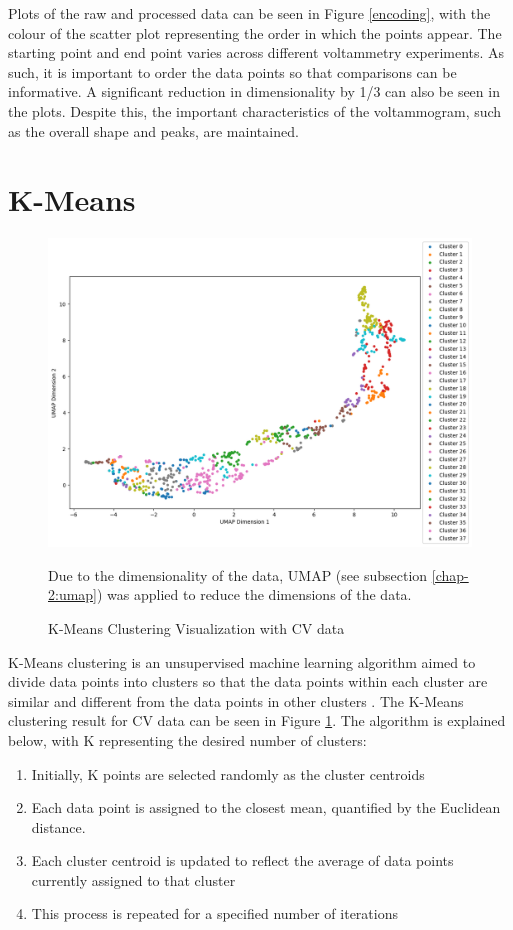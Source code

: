 Plots of the raw and processed data can be seen in Figure \ref{encoding}, with the colour of the scatter plot representing the order in which the points appear. The starting point and end point varies across different voltammetry experiments. As such, it is important to order the data points so that comparisons can be informative. A significant reduction in dimensionality by 1/3 can also be seen in the plots. Despite this, the important characteristics of the voltammogram, such as the overall shape and peaks, are maintained.
\section{K-Means}
\begin{figure}[h!]
  \centering
    \includegraphics[width=1.0\textwidth]{figures/k-means.png}
    \caption{K-Means Clustering Visualization with CV data}
    \label{kmeans}
    Due to the dimensionality of the data, UMAP (see subsection \ref{chap-2:umap}) was applied to reduce the dimensions of the data.
\end{figure}
K-Means clustering is an unsupervised machine learning algorithm aimed to divide data points into clusters so that the data points within each cluster are similar and different from the data points in other clusters \cite{MacQueen1967}. The K-Means clustering result for CV data can be seen in Figure \ref{kmeans}. The algorithm is explained below, with K representing the desired number of clusters:
\begin{enumerate}
    \item Initially, K points are selected randomly as the cluster centroids
    \item Each data point is assigned to the closest mean, quantified by the Euclidean distance. 
    \item Each cluster centroid is updated to reflect the average of data points currently assigned to that cluster 
    \item This process is repeated for a specified number of iterations
\end{enumerate}
